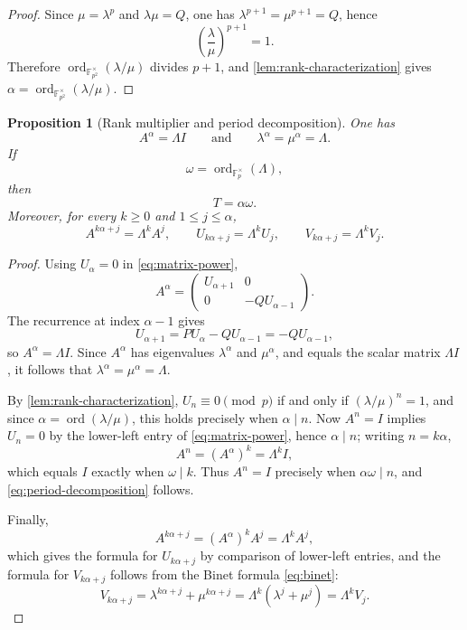 \documentclass[11pt]{article}
\newcommand{\ord}{\operatorname{ord}}
\newcommand{\Fp}{\mathbb{F}_p}
\newcommand{\Fpq}{\mathbb{F}_{p^2}}
\theoremstyle{plain}
\newtheorem{proposition}[theorem]{Proposition}
\theoremstyle{definition}
\begin{document}
\begin{proof}
Since $\mu=\lambda^p$ and $\lambda\mu=Q$, one has $\lambda^{p+1}=\mu^{p+1}=Q$, hence
\[
 \left(\frac{\lambda}{\mu}\right)^{p+1}=1.
\]
Therefore $\ord_{\Fpq^\times}(\lambda/\mu)$ divides $p+1$, and \cref{lem:rank-characterization} gives $\alpha=\ord_{\Fpq^\times}(\lambda/\mu)$.
\end{proof}

\begin{proposition}[Rank multiplier and period decomposition]
\label{prop:rank-multiplier}
One has
\[
 A^\alpha=\Lambda I
 \qquad\text{and}\qquad
 \lambda^\alpha=\mu^\alpha=\Lambda.
\]
If
\[
 \omega=\ord_{\Fp^\times}(\Lambda),
\]
then
\begin{equation}
 T=\alpha\omega.
 \label{eq:period-decomposition}
\end{equation}
Moreover, for every $k\geq0$ and $1\leq j\leq\alpha$,
\[
 A^{k\alpha+j}=\Lambda^kA^j,
 \qquad
 U_{k\alpha+j}=\Lambda^kU_j,
 \qquad
 V_{k\alpha+j}=\Lambda^kV_j.
\]
\end{proposition}

\begin{proof}
Using $U_\alpha=0$ in \eqref{eq:matrix-power},
\[
 A^\alpha=
 \begin{pmatrix}
 U_{\alpha+1}&0\\
 0&-Q U_{\alpha-1}
 \end{pmatrix}.
\]
The recurrence at index $\alpha-1$ gives
\[
 U_{\alpha+1}=P U_\alpha-Q U_{\alpha-1}
             =-Q U_{\alpha-1},
\]
so $A^\alpha=\Lambda I$. Since $A^\alpha$ has eigenvalues $\lambda^\alpha$ and $\mu^\alpha$, and equals the scalar matrix $\Lambda I$, it follows that $\lambda^\alpha=\mu^\alpha=\Lambda$.

By \cref{lem:rank-characterization}, $U_n\equiv0\pmod p$ if and only if $(\lambda/\mu)^n=1$, and since $\alpha=\ord(\lambda/\mu)$, this holds precisely when $\alpha\mid n$. Now $A^n=I$ implies $U_n=0$ by the lower-left entry of \eqref{eq:matrix-power}, hence $\alpha\mid n$; writing $n=k\alpha$,
\[
 A^n=(A^\alpha)^k=\Lambda^k I,
\]
which equals $I$ exactly when $\omega\mid k$. Thus $A^n=I$ precisely when $\alpha\omega\mid n$, and \eqref{eq:period-decomposition} follows.

Finally,
\[
 A^{k\alpha+j}
 =(A^\alpha)^kA^j
 =\Lambda^kA^j,
\]
which gives the formula for $U_{k\alpha+j}$ by comparison of lower-left entries, and the formula for $V_{k\alpha+j}$ follows from the Binet formula \eqref{eq:binet}:
\[
 V_{k\alpha+j}
 =\lambda^{k\alpha+j}+\mu^{k\alpha+j}
 =\Lambda^k(\lambda^j+\mu^j)
 =\Lambda^kV_j.
\]
\end{proof}
\end{document}
